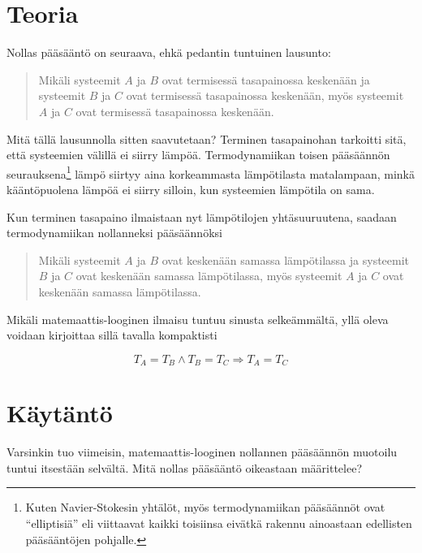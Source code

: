 \documentclass[12pt,a4paper,finnish]{book}
\begin{document}
\section{Teoria} %

Nollas pääsääntö on seuraava, ehkä pedantin tuntuinen lausunto:

\begin{quote}
 Mikäli systeemit $A$ ja $B$ ovat termisessä tasapainossa keskenään ja systeemit $B$ ja $C$ ovat 
 termisessä tasapainossa keskenään, myös systeemit $A$ ja $C$ ovat termisessä tasapainossa keskenään.
\end{quote}

Mitä tällä lausunnolla sitten saavutetaan? Terminen tasapainohan tarkoitti sitä, että systeemien 
välillä ei siirry lämpöä. Termodynamiikan toisen pääsäännön seurauksena\footnote{Kuten Navier-Stokesin 
yhtälöt, myös termodynamiikan pääsäännöt ovat ``elliptisiä'' eli viittaavat kaikki toisiinsa eivätkä 
rakennu ainoastaan edellisten pääsääntöjen pohjalle.} lämpö siirtyy aina korkeammasta 
lämpötilasta matalampaan, minkä kääntöpuolena lämpöä ei siirry silloin, kun systeemien lämpötila 
on sama.

Kun terminen tasapaino ilmaistaan nyt lämpötilojen yhtäsuuruutena, saadaan termodynamiikan nollanneksi 
pääsäännöksi

\begin{quote}
 Mikäli systeemit $A$ ja $B$ ovat keskenään samassa lämpötilassa ja systeemit $B$ ja $C$ ovat 
 keskenään samassa lämpötilassa, myös systeemit $A$ ja $C$ ovat keskenään samassa lämpötilassa.
\end{quote}

Mikäli matemaattis-looginen ilmaisu tuntuu sinusta selkeämmältä, yllä oleva voidaan kirjoittaa 
sillä tavalla kompaktisti 

\begin{equation}
 T_A = T_B \wedge T_B = T_C \Rightarrow T_A = T_C
\end{equation}

\section{Käytäntö} %

Varsinkin tuo viimeisin, matemaattis-looginen nollannen pääsäännön muotoilu tuntui itsestään 
selvältä. Mitä nollas pääsääntö oikeastaan määrittelee?
\end{document}
